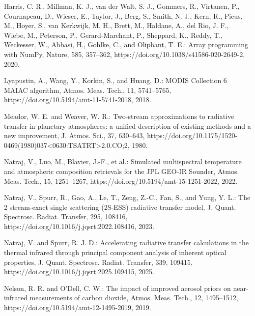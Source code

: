 \documentclass[gmd, manuscript]{copernicus}
\begin{document}
\begin{thebibliography}{}
Harris, C. R., Millman, K. J., van der Walt, S. J., Gommers, R.,
Virtanen, P., Cournapeau, D., Wieser, E., Taylor, J., Berg, S.,
Smith, N. J., Kern, R., Picus, M., Hoyer, S., van Kerkwijk, M. H.,
Brett, M., Haldane, A., del Rio, J. F., Wiebe, M., Peterson, P.,
Gerard-Marchant, P., Sheppard, K., Reddy, T., Weckesser, W.,
Abbasi, H., Gohlke, C., and Oliphant, T. E.: Array programming with NumPy,
Nature, 585, 357--362, https://doi.org/10.1038/s41586-020-2649-2, 2020.

Lyapustin, A., Wang, Y., Korkin, S., and Huang, D.: MODIS Collection 6 MAIAC
algorithm, Atmos. Meas. Tech., 11, 5741--5765,
https://doi.org/10.5194/amt-11-5741-2018, 2018.

Meador, W. E. and Weaver, W. R.: Two-stream approximations to radiative
transfer in planetary atmospheres: a unified description of existing methods and
a new improvement, J. Atmos. Sci., 37, 630--643,
https://doi.org/10.1175/1520-0469(1980)037<0630:TSATRT>2.0.CO;2, 1980.

Natraj, V., Luo, M., Blavier, J.-F., et al.: Simulated multispectral
temperature and atmospheric composition retrievals for the JPL GEO-IR Sounder,
Atmos. Meas. Tech., 15, 1251--1267, https://doi.org/10.5194/amt-15-1251-2022,
2022.

Natraj, V., Spurr, R., Gao, A., Le, T., Zeng, Z.-C., Fan, S., and Yung, Y. L.:
The 2 stream-exact single scattering (2S-ESS) radiative transfer model, J.
Quant. Spectrosc. Radiat. Transfer, 295, 108416,
https://doi.org/10.1016/j.jqsrt.2022.108416, 2023.

Natraj, V. and Spurr, R. J. D.: Accelerating radiative transfer calculations in
the thermal infrared through principal component analysis of inherent optical
properties, J. Quant. Spectrosc. Radiat. Transfer, 339, 109415,
https://doi.org/10.1016/j.jqsrt.2025.109415, 2025.

Nelson, R. R. and O'Dell, C. W.: The impact of improved aerosol priors on
near-infrared measurements of carbon dioxide, Atmos. Meas. Tech., 12,
1495--1512, https://doi.org/10.5194/amt-12-1495-2019, 2019.


\end{thebibliography}
\end{document}
